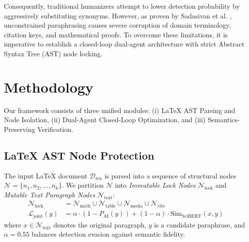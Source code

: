 \documentclass[10pt,journal,compsoc]{IEEEtran}
\begin{document}
Consequently, traditional humanizers attempt to lower detection probability by aggressively substituting synonyms. However, as proven by Sadasivan et al. \cite{sadasivan2024can}, unconstrained paraphrasing causes severe corruption of domain terminology, citation keys, and mathematical proofs. To overcome these limitations, it is imperative to establish a closed-loop dual-agent architecture with strict Abstract Syntax Tree (AST) node locking.

\section{Methodology}
Our framework consists of three unified modules: (i) LaTeX AST Parsing and Node Isolation, (ii) Dual-Agent Closed-Loop Optimization, and (iii) Semantics-Preserving Verification.

\subsection{LaTeX AST Node Protection}
The input LaTeX document $\mathcal{D}_{\text{tex}}$ is parsed into a sequence of structural nodes $\mathcal{N} = \{n_1, n_2, \dots, n_k\}$. We partition $\mathcal{N}$ into \textit{Immutable Lock Nodes} $\mathcal{N}_{\text{lock}}$ and \textit{Mutable Text Paragraph Nodes} $\mathcal{N}_{\text{text}}$:
\begin{align}
\label{eq:joint_loss}
\mathcal{N}_{\text{lock}} &= \mathcal{N}_{\text{math}} \cup \mathcal{N}_{\text{table}} \cup \mathcal{N}_{\text{media}} \cup \mathcal{N}_{\text{cite}} \\
\mathcal{L}_{\text{joint}}(y) &= \alpha \cdot \left(1 - P_{\text{AI}}(y)\right) + (1 - \alpha) \cdot \text{Sim}_{\text{SciBERT}}(x, y)
\end{align}
where $x \in \mathcal{N}_{\text{text}}$ denotes the original paragraph, $y$ is a candidate paraphrase, and $\alpha = 0.55$ balances detection evasion against semantic fidelity.
\end{document}

